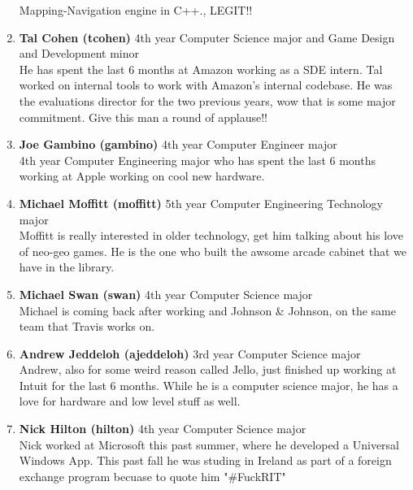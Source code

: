 \documentclass[9pt]{extarticle}
\begin{document}
\begin{enumerate}
	Mapping-Navigation engine in C++., LEGIT!!
\\
\item \textbf{Tal Cohen (tcohen)} 4th year Computer Science major and Game Design and Development minor \\
	He has spent the last 6 months at Amazon working as a SDE intern. Tal worked
	on internal tools to work with Amazon's internal codebase. He was the 
	evaluations director for the two previous years, wow that is some major 
	commitment. Give this man a round of applause!!
\\
\item \textbf{Joe Gambino (gambino)} 4th year Computer Engineer major \\
	4th year Computer Engineering major who	has spent the last 6 months
	working at Apple working on cool new hardware.
\\
\item \textbf{Michael Moffitt (moffitt)} 5th year Computer Engineering Technology major \\
    Moffitt is really interested in older technology, get him talking about 
    his love of neo-geo games. He is the one who built the awsome arcade 
    cabinet that we have in the library.
\\
\item \textbf{Michael Swan (swan)} 4th year Computer Science major \\
    Michael is coming back after working and Johnson \& Johnson, on the same
    team that Travis works on.
\\
\item \textbf{Andrew Jeddeloh (ajeddeloh)} 3rd year Computer Science major \\
    Andrew, also for some weird reason called Jello, just finished up working
    at Intuit for the last 6 months. While he is a computer science major,
    he has a love for hardware and low level stuff as well.
\\
\item \textbf{Nick Hilton (hilton)} 4th year Computer Science major \\
    Nick worked at Microsoft this past summer, where he developed a Universal
    Windows App. This past fall he was studing in Ireland as part of a foreign exchange 
    program becuase to quote him "\#FuckRIT"
\\
\end{enumerate}
\end{document}
